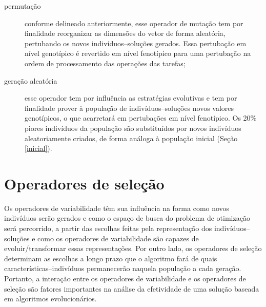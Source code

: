 \documentclass[relatorio,nocolorlinks]{inf-ufg}
\begin{document}
\begin{description}
\item[permuta\c{c}\~{a}o] conforme delineado anteriormente, esse operador de muta\c{c}\~{a}o tem por finalidade reorganizar as dimens\~{o}es do
vetor de forma aleat\'{o}ria, pertubando os novos indiv\'{i}duos--solu\c{c}\~{o}es gerados. Essa pertuba\c{c}\~{a}o em n\'{i}vel genot\'{i}pico
\'{e} revertido em n\'{i}vel fenot\'{i}pico para uma pertuba\c{c}\~{a}o na ordem de processamento das opera\c{c}\~{o}es das tarefas;
\item[gera\c{c}\~{a}o aleat\'{o}ria] esse operador tem por influ\^{e}ncia as estrat\'{e}gias evolutivas \cite{Goncalves2002} e tem por finalidade
prover \`{a} popula\c{c}\~{a}o de indiv\'{i}duos--solu\c{c}\~{o}es novos valores genot\'{i}picos, o que acarretar\'{a} em pertuba\c{c}\~{o}es em
n\'{i}vel fenot\'{i}pico. Os 20\% piores indiv\'{i}duos da popula\c{c}\~{a}o s\~{a}o substitu\'{i}dos por novos indiv\'{i}duos aleatoriamente
criados, de forma an\'{a}loga \`{a} popula\c{c}\~{a}o inicial (Se\c{c}\~{a}o \ref{inicial}).
\end{description}

\section{Operadores de sele\c{c}\~{a}o}

Os operadores de variabilidade t\^{e}m sua influ\^{e}ncia na forma como novos indiv\'{i}duos ser\~{a}o gerados e como o espa\c{c}o de busca do
problema de otimiza\c{c}\~{a}o ser\'{a} percorrido, a partir das escolhas feitas pela representa\c{c}\~{a}o dos indiv\'{i}duos--solu\c{c}\~{o}es
e como os operadores de variabilidade s\~{a}o capazes de evoluir/transformar essas representa\c{c}\~{o}es. Por outro lado, os operadores de
sele\c{c}\~{a}o determinam as escolhas a longo prazo que o algoritmo far\'{a} de quais caracter\'{i}sticas--indiv\'{i}duos permanecer\~{a}o
naquela popula\c{c}\~{a}o a cada gera\c{c}\~{a}o. Portanto, a intera\c{c}\~{a}o entre os operadores de variabilidade e os operadores de
sele\c{c}\~{a}o s\~{a}o fatores importantes na an\'{a}lise da efetividade de uma solu\c{c}\~{a}o baseada em algoritmos evolucion\'{a}rios.
\end{document}
